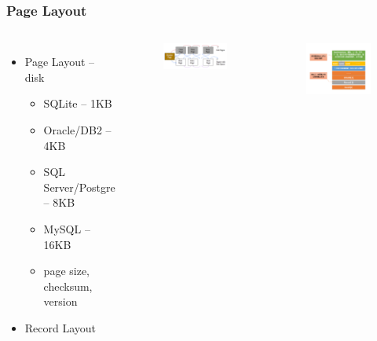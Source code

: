 \begin{frame}[fragile]
	\frametitle{Page Layout}
\begin{columns}[c] %

	\begin{itemize}
		\item Page Layout – disk
		\begin{itemize}
			\item SQLite – 1KB
			\item Oracle/DB2 – 4KB
			\item SQL Server/Postgre – 8KB
			\item MySQL – 16KB
			\item page size, checksum, version
		\end{itemize}
		\item Record Layout
	\end{itemize}
		\begin{figure}
			\includegraphics[width=.9\linewidth]{figs/dbfile-heapfile1.png}
		\end{figure}
		\begin{figure}
			\includegraphics[width=1.1\linewidth]{figs/dbfile-records.png}
		\end{figure}


\end{columns}
\end{frame}

